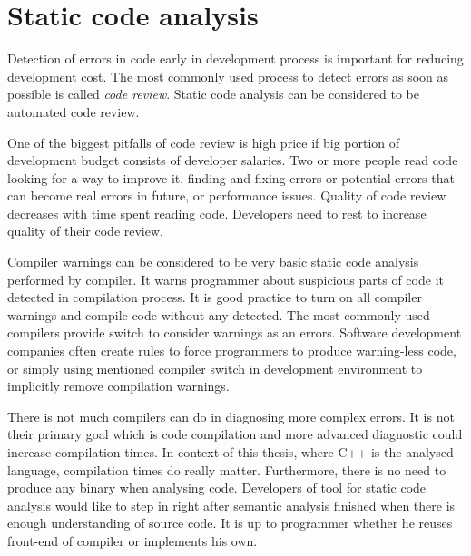 \chapter{Static code analysis}
Detection of errors in code early in development process is important for reducing development cost. The most commonly used process to detect errors as soon as possible is called \emph{code review}. Static code analysis can be considered to be automated code review.

One of the biggest pitfalls of code review is high price if big portion of development budget consists of developer salaries. Two or more people read code looking for a way to improve it, finding and fixing errors or potential errors that can become real errors in future, or performance issues. Quality of code review decreases with time spent reading code. Developers need to rest to increase quality of their code review.

Compiler warnings can be considered to be very basic static code analysis performed by compiler. It warns programmer about suspicious parts of code it detected in compilation process. It is good practice to turn on all compiler warnings and compile code without any detected. The most commonly used compilers provide switch to consider warnings as an errors. Software development companies often create rules to force programmers to produce warning-less code, or simply using mentioned compiler switch in development environment to implicitly remove compilation warnings.

There is not much compilers can do in diagnosing more complex errors. It is not their primary goal which is code compilation and more advanced diagnostic could increase compilation times. In context of this thesis, where C++  is the analysed language, compilation times do really matter. Furthermore, there is no need to produce any binary when analysing code. Developers of tool for static code analysis would like to step in right after semantic analysis finished when there is enough understanding of source code. It is up to programmer whether he reuses front-end of compiler or implements his own.

